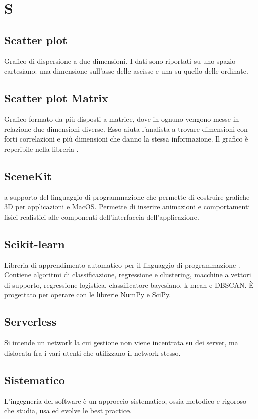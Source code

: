 \section*{S}
\markright{}

\subsection*{Scatter plot}
Grafico di dispersione a due dimensioni. I dati sono riportati su uno spazio cartesiano: una dimensione sull'asse delle ascisse e una su quello delle ordinate. 

\subsection*{Scatter plot Matrix}
Grafico formato da più  disposti a matrice, dove in ognuno vengono messe in relazione due dimensioni diverse. Esso aiuta l'analista a trovare dimensioni con forti correlazioni e più  dimensioni che danno la stessa informazione. Il grafico è reperibile nella libreria .

\subsection*{SceneKit}
 a supporto del linguaggio di programmazione  che permette di costruire grafiche 3D per applicazioni  e MacOS. Permette di inserire animazioni e comportamenti fisici realistici alle componenti dell'interfaccia dell'applicazione. 

\subsection*{Scikit-learn}
Libreria  di apprendimento automatico per il linguaggio di programmazione . Contiene algoritmi di classificazione, regressione e clustering, macchine a vettori di supporto, regressione logistica, classificatore bayesiano, k-mean e DBSCAN. È progettato per operare con le librerie NumPy e SciPy. 

\subsection*{Serverless}
Si intende un network la cui gestione non viene incentrata su dei server, ma dislocata fra i vari utenti che utilizzano il network stesso.

\subsection*{Sistematico}
L'ingegneria del software è un approccio sistematico, ossia metodico e rigoroso che studia, usa ed evolve le best practice.

